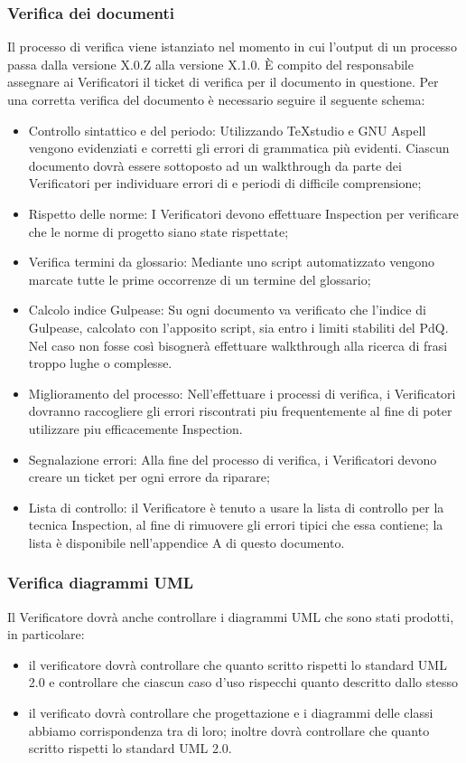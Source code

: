 \subsubsection{Verifica dei documenti}
\label{11.1}
Il processo di verifica viene istanziato nel momento in cui l’output di un processo passa
dalla versione X.0.Z alla versione X.1.0. È compito del responsabile assegnare ai Verificatori il ticket di verifica per il documento in questione.
Per una corretta verifica del documento è necessario seguire il seguente schema:
\begin{itemize}
\item Controllo sintattico e del periodo: Utilizzando TeXstudio e GNU Aspell vengono evidenziati e corretti gli errori di grammatica più evidenti. Ciascun documento dovrà essere sottoposto ad un walkthrough da parte dei Verificatori per individuare errori di  e periodi di difficile comprensione;
\item Rispetto delle norme: I Verificatori devono effettuare Inspection per verificare che le norme di progetto siano state rispettate;
\item Verifica termini da glossario: Mediante uno script automatizzato vengono marcate tutte le prime occorrenze di un termine del glossario;
\item Calcolo indice Gulpease: Su ogni documento va verificato che l'indice di Gulpease, calcolato con l'apposito script, sia entro i limiti stabiliti del PdQ. Nel caso non fosse così bisognerà effettuare walkthrough alla ricerca di frasi troppo lughe o complesse.
\item Miglioramento del processo: Nell'effettuare i processi di verifica, i Verificatori dovranno raccogliere gli errori riscontrati piu frequentemente al fine di poter utilizzare piu efficacemente Inspection.
\item Segnalazione errori: Alla fine del processo di verifica, i Verificatori devono creare un ticket per ogni errore da riparare;
\item Lista di controllo: il Verificatore è tenuto a usare la lista di controllo per la tecnica Inspection, al fine di rimuovere gli errori tipici che essa contiene; la lista è disponibile nell'appendice A di questo documento.
\end{itemize}

\subsubsection{Verifica diagrammi UML}
Il Verificatore dovrà anche controllare i diagrammi UML che sono stati prodotti, in particolare:
\begin{itemize}
\item {} il verificatore dovrà controllare che quanto scritto rispetti lo standard UML 2.0 e controllare che ciascun caso d'uso rispecchi quanto descritto dallo stesso
\item {} il verificato dovrà controllare che progettazione e i diagrammi delle classi abbiamo corrispondenza tra di loro; inoltre dovrà controllare che quanto scritto rispetti lo standard UML 2.0.
\end{itemize}


